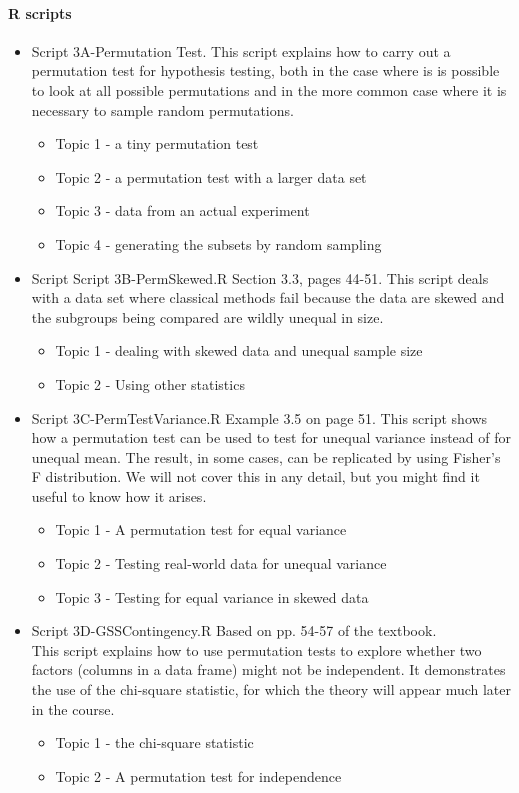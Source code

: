 \documentclass[12pt]{article}
\begin{document}
\pagebreak


\paragraph*{R scripts}
\begin{itemize}
\item Script 3A-Permutation Test. This script explains how to carry out a permutation test for hypothesis testing, both in the case where is is possible to look at all possible permutations and in the more common case where it is necessary to sample random permutations.
\begin{itemize}
\item Topic 1 - a tiny permutation test
\item Topic 2 - a permutation test with a larger data set
\item Topic 3 - data from an actual experiment
\item Topic 4 - generating the subsets by random sampling
\end{itemize}
\item Script Script 3B-PermSkewed.R  Section 3.3, pages 44-51.
This script deals with a data set where classical methods fail because the data are skewed and the subgroups being compared are wildly unequal in size.
\begin{itemize}
\item Topic 1 - dealing with skewed data and unequal sample size
\item Topic 2 - Using other statistics 
\end{itemize}

\item Script 3C-PermTestVariance.R     Example 3.5 on page 51.
This script shows how a permutation test can be used to test for unequal variance instead of for unequal mean. The result, in some cases, can be replicated by using Fisher's F distribution. We will not cover this in any detail, but you might find it useful to know how it arises.
\begin{itemize}
\item Topic 1 - A permutation test for equal variance
\item Topic 2 - Testing real-world data for unequal variance
\item Topic 3 - Testing for equal variance in skewed data
\end{itemize}

\item Script 3D-GSSContingency.R     Based on pp. 54-57 of the textbook.\\
This script explains how to use permutation tests to explore whether two factors (columns in a data frame) might not be independent. It demonstrates the use of the chi-square statistic, for which the theory will appear much later in the course.
\begin{itemize}
\item Topic 1 - the chi-square statistic
\item Topic 2 - A permutation test for independence
\end{itemize}


\end{itemize}
\end{document}
